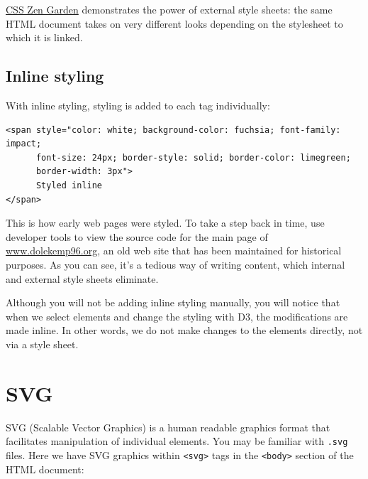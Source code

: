 \documentclass[openany]{book}
\begin{document}
\href{http://www.csszengarden.com/}{CSS Zen Garden} demonstrates the power of external style sheets: the same HTML document takes on very different looks depending on the stylesheet to which it is linked.

\hypertarget{inline-styling}{%
\subsection{Inline styling}\label{inline-styling}}

With inline styling, styling is added to each tag individually:

\begin{verbatim}
<span style="color: white; background-color: fuchsia; font-family: impact; 
      font-size: 24px; border-style: solid; border-color: limegreen; 
      border-width: 3px">
      Styled inline
</span>
\end{verbatim}

This is how early web pages were styled. To take a step back in time, use developer tools to view the source code for the main page of \href{http://www.dolekemp96.org/main.htm}{www.dolekemp96.org}, an old web site that has been maintained for historical purposes. As you can see, it's a tedious way of writing content, which internal and external style sheets eliminate.

Although you will not be adding inline styling manually, you will notice that when we select elements and change the styling with D3, the modifications are made inline. In other words, we do not make changes to the elements directly, not via a style sheet.

\hypertarget{svg}{%
\section{SVG }\label{svg}}

SVG (Scalable Vector Graphics) is a human readable graphics format that facilitates manipulation of individual elements. You may be familiar with \texttt{.svg} files. Here we have SVG graphics within \texttt{\textless{}svg\textgreater{}} tags in the \texttt{\textless{}body\textgreater{}} section of the HTML document:
\end{document}
